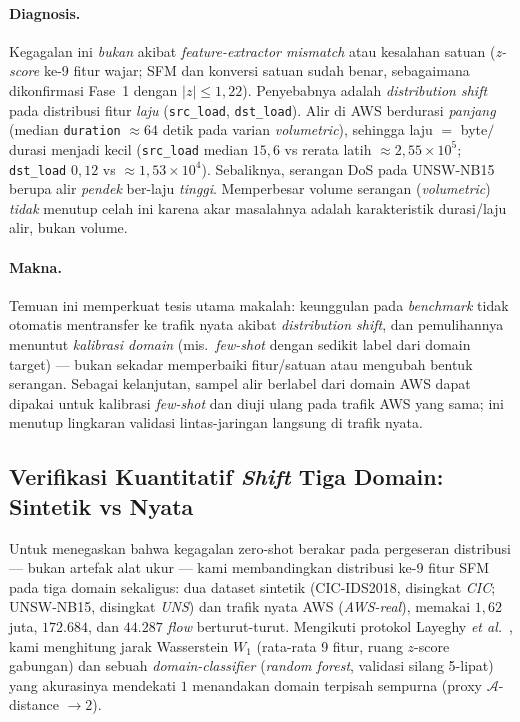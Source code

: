 \documentclass[11pt,a4paper]{article}
\begin{document}
\paragraph{Diagnosis.} Kegagalan ini \emph{bukan} akibat \emph{feature-extractor
mismatch} atau kesalahan satuan (\emph{z-score} ke-9 fitur wajar; SFM dan konversi
satuan sudah benar, sebagaimana dikonfirmasi Fase~1 dengan $|z|\le 1{,}22$).
Penyebabnya adalah \emph{distribution shift} pada distribusi fitur \emph{laju}
(\texttt{src\_load}, \texttt{dst\_load}). Alir di AWS berdurasi \emph{panjang}
(median \texttt{duration} $\approx 64$ detik pada varian \emph{volumetric}), sehingga
laju $=$ byte$/$durasi menjadi kecil (\texttt{src\_load} median $15{,}6$ vs rerata
latih $\approx 2{,}55\times10^{5}$; \texttt{dst\_load} $0{,}12$ vs $\approx 1{,}53\times10^{4}$).
Sebaliknya, serangan DoS pada UNSW-NB15 berupa alir \emph{pendek} ber-laju
\emph{tinggi}. Memperbesar volume serangan (\emph{volumetric}) \emph{tidak} menutup
celah ini karena akar masalahnya adalah karakteristik durasi/laju alir, bukan volume.

\paragraph{Makna.} Temuan ini memperkuat tesis utama makalah: keunggulan pada
\emph{benchmark} tidak otomatis mentransfer ke trafik nyata akibat
\emph{distribution shift}, dan pemulihannya menuntut \emph{kalibrasi domain}
(mis.\ \emph{few-shot} dengan sedikit label dari domain target) --- bukan sekadar
memperbaiki fitur/satuan atau mengubah bentuk serangan. Sebagai kelanjutan, sampel
alir berlabel dari domain AWS dapat dipakai untuk kalibrasi \emph{few-shot} dan
diuji ulang pada trafik AWS yang sama; ini menutup lingkaran validasi lintas-jaringan
langsung di trafik nyata.

\subsection{Verifikasi Kuantitatif \emph{Shift} Tiga Domain: Sintetik vs Nyata}
\label{sec:rt-shift}

Untuk menegaskan bahwa kegagalan zero-shot berakar pada pergeseran distribusi ---
bukan artefak alat ukur --- kami membandingkan distribusi ke-9 fitur SFM pada tiga
domain sekaligus: dua dataset sintetik (CIC-IDS2018, disingkat \emph{CIC};
UNSW-NB15, disingkat \emph{UNS}) dan trafik nyata AWS (\emph{AWS-real}), memakai
$1{,}62$ juta, $172{.}684$, dan $44{.}287$ \emph{flow} berturut-turut. Mengikuti
protokol Layeghy \emph{et al.}~\cite{layeghy}, kami menghitung jarak Wasserstein
$W_1$ (rata-rata 9 fitur, ruang $z$-score gabungan) dan sebuah
\emph{domain-classifier} (\emph{random forest}, validasi silang 5-lipat) yang
akurasinya mendekati $1$ menandakan domain terpisah sempurna (proxy
$\mathcal{A}$-distance $\to 2$).
\end{document}
